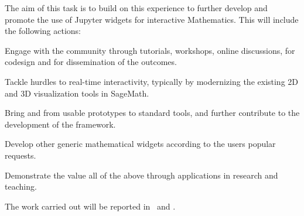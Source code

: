 \begin{task}[
  title=Demonstrator: Interactive Mathematics with Jupyter Widgets,
  id=math,
  lead=UPSUD,
  PM=15, %
  wphases={0-36},
  partners={EGI,EP,QS}
  ]

  The aim of this task is to build on this experience to further
  develop and promote the use of Jupyter widgets for interactive
  Mathematics. This will include the following actions:
  \begin{compactitem}
  \item Engage with the community through tutorials, workshops, online
    discussions, for codesign and for dissemination of the outcomes.
  \item Tackle hurdles to real-time interactivity, typically by
    modernizing the existing 2D and 3D visualization tools in
    SageMath. %
  \item Bring  and
     from usable prototypes to standard tools,
    and further contribute to the development of the 
    framework.
  \item Develop other generic mathematical widgets according to the
    users popular requests.
  \item Demonstrate the value all of the above through applications in
    research and teaching.
  \end{compactitem}
  The work carried out will be reported in~ and .
\end{task}

